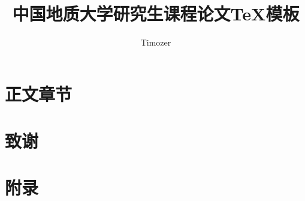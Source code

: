 \documentclass{cugrep}
\title{中国地质大学研究生课程论文\TeX{}模板}
\author{Timozer}
\begin{document}
    \maketitle

    \frontmatter
    \makeabstract
    \tableofcontents
    \clearpage

    \mainmatter
    \chapter{正文章节}

    \backmatter
    \chapter{致谢}

    \appendix
    \chapter{附录} 
\end{document}
